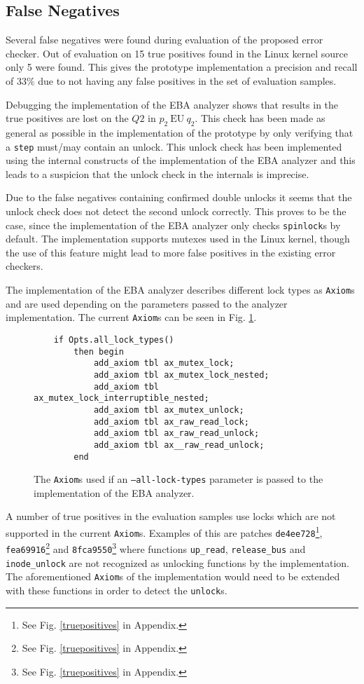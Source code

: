 \subsection{False Negatives}

Several false negatives were found during evaluation of the proposed error checker. Out of evaluation on 15 true positives found in the Linux kernel source only 5 were found. This gives the prototype implementation a precision and recall of $33\%$ due to not having any false positives in the set of evaluation samples. 

\newpar Debugging the implementation of the EBA analyzer shows that results in the true positives are lost on the $Q2$ in $p_2\:\mathrm{EU}\:q_2$. This check has been made as general as possible in the implementation of the prototype by only verifying that a \texttt{step} must/may contain an unlock. This unlock check has been implemented using the internal constructs of the implementation of the EBA analyzer and this leads to a suspicion that the unlock check in the internals is imprecise. 

\newpar Due to the false negatives containing confirmed double unlocks it seems that the unlock check does not detect the second unlock correctly. This proves to be the case, since the implementation of the EBA analyzer only checks \texttt{spinlock}s by default. The implementation supports mutexes used in the Linux kernel, though the use of this feature might lead to more false positives in the existing error checkers. 

\newpar The implementation of the EBA analyzer describes different lock types as \texttt{Axiom}s and are used depending on the parameters passed to the analyzer implementation. The current \texttt{Axiom}s can be seen in Fig. \ref{axioms}.  

\begin{figure}[H]
    \centering
    \begin{verbatim}
    if Opts.all_lock_types()
        then begin
            add_axiom tbl ax_mutex_lock;
            add_axiom tbl ax_mutex_lock_nested;
            add_axiom tbl ax_mutex_lock_interruptible_nested;
            add_axiom tbl ax_mutex_unlock;
            add_axiom tbl ax_raw_read_lock;
            add_axiom tbl ax_raw_read_unlock;
            add_axiom tbl ax__raw_read_unlock;
        end
    \end{verbatim}
    \caption{The \texttt{Axiom}s used if an \texttt{--all-lock-types} parameter is passed to the implementation of the EBA analyzer.}
    \label{axioms}
\end{figure}

\newpar A number of true positives in the evaluation samples use locks which are not supported in the current \texttt{Axiom}s. Examples of this are patches \texttt{de4ee728}\footnote{See Fig. \ref{truepositives} in Appendix.}, \texttt{fea69916}\footnote{See Fig. \ref{truepositives} in Appendix.} and \texttt{8fca9550}\footnote{See Fig. \ref{truepositives} in Appendix.} where functions \texttt{up\_read}, \texttt{release\_bus} and \texttt{inode\_unlock} are not recognized as unlocking functions by the implementation. The aforementioned \texttt{Axiom}s of the implementation would need to be extended with these functions in order to detect the \texttt{unlock}s.  
